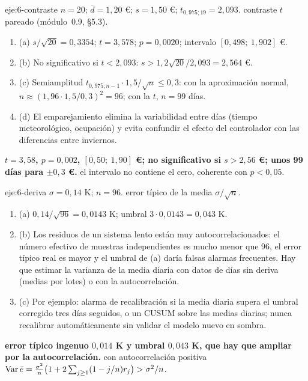 \begin{solucion}{eje:6-contraste}
\datos $n=20$; $\bar d=1{,}20$ €; $s=1{,}50$ €; $t_{0{,}975;19}=2{,}093$.
\planteamiento contraste $t$ pareado (módulo~0.9, §5.3).
\pasos
\begin{enumerate}[label=\arabic*.]
  \item (a) $s/\sqrt{20}=0{,}3354$; $t=3{,}578$; $p=0{,}0020$; intervalo $[0{,}498;\ 1{,}902]$ €.
  \item (b) No significativo si $t<2{,}093$: $s>1{,}2\sqrt{20}/2{,}093=2{,}564$ €.
  \item (c) Semiamplitud $t_{0{,}975;n-1}\cdot1{,}5/\sqrt n\le0{,}3$: con la aproximación normal, $n\approx(1{,}96\cdot1{,}5/0{,}3)^{2}=96$; con la $t$, $n=99$ días.
  \item (d) El emparejamiento elimina la variabilidad entre días (tiempo meteorológico, ocupación) y evita confundir el efecto del controlador con las diferencias entre inviernos.
\end{enumerate}
\resultado \textbf{$t=3{,}58$, $p=0{,}002$, $[0{,}50;\ 1{,}90]$ €; no significativo si $s>2{,}56$ €; unos 99 días para $\pm0{,}3$ €.}
\comprobacion el intervalo no contiene el cero, coherente con $p<0{,}05$.
\end{solucion}

\begin{solucion}{eje:6-deriva}
\datos $\sigma=0{,}14$ K; $n=96$.
\planteamiento error típico de la media $\sigma/\sqrt n$.
\pasos
\begin{enumerate}[label=\arabic*.]
  \item (a) $0{,}14/\sqrt{96}=0{,}0143$ K; umbral $3\cdot0{,}0143=0{,}043$ K.
  \item (b) Los residuos de un sistema lento están muy autocorrelacionados: el número efectivo de muestras independientes es mucho menor que 96, el error típico real es mayor y el umbral de (a) daría falsas alarmas frecuentes. Hay que estimar la varianza de la media diaria con datos de días sin deriva (medias por lotes) o con la autocorrelación.
  \item (c) Por ejemplo: alarma de recalibración si la media diaria supera el umbral corregido tres días seguidos, o un CUSUM sobre las medias diarias; nunca recalibrar automáticamente sin validar el modelo nuevo en sombra.
\end{enumerate}
\resultado \textbf{error típico ingenuo $0{,}014$ K y umbral $0{,}043$ K, que hay que ampliar por la autocorrelación.}
\comprobacion con autocorrelación positiva $\operatorname{Var}\bar e=\frac{\sigma^{2}}{n}\bigl(1+2\sum_{j\ge1}(1-j/n)r_j\bigr)>\sigma^{2}/n$.
\end{solucion}

